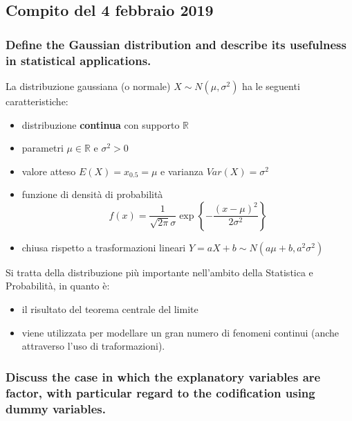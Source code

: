 \documentclass[
]{article}
\begin{document}
\hypertarget{compito-del-4-febbraio-2019}{%
\subsection{Compito del 4 febbraio
2019}\label{compito-del-4-febbraio-2019}}

\hypertarget{define-the-gaussian-distribution-and-describe-its-usefulness-in-statistical-applications.}{%
\subsubsection{Define the Gaussian distribution and describe its
usefulness in statistical
applications.}\label{define-the-gaussian-distribution-and-describe-its-usefulness-in-statistical-applications.}}

La distribuzione gaussiana (o normale) \(X \sim N(\mu, \sigma^2)\) ha le
seguenti caratteristiche:

\begin{itemize}
\item
  distribuzione \textbf{continua} con supporto \(\mathbb{R}\)
\item
  parametri \(\mu \in \mathbb{R}\) e \(\sigma^2 > 0\)
\item
  valore atteso \(E(X) = x_{0.5} = \mu\) e varianza
  \(Var(X) = \sigma^2\)
\item
  funzione di densità di probabilità
  \[f(x) = \frac{1}{\sqrt{2\pi}\sigma}\exp \left\{ - \frac{(x-\mu)^2}{2\sigma^2} \right\}\]
\item
  chiusa rispetto a trasformazioni lineari
  \(Y = aX+b \sim N(a\mu+b, a^2\sigma^2)\)
\end{itemize}

Si tratta della distribuzione più importante nell'ambito della
Statistica e Probabilità, in quanto è:

\begin{itemize}
\item
  il risultato del teorema centrale del limite
\item
  viene utilizzata per modellare un gran numero di fenomeni continui
  (anche attraverso l'uso di traformazioni).
\end{itemize}

\hypertarget{discuss-the-case-in-which-the-explanatory-variables-are-factor-with-particular-regard-to-the-codification-using-dummy-variables.}{%
\subsubsection{Discuss the case in which the explanatory variables are
factor, with particular regard to the codification using dummy
variables.}\label{discuss-the-case-in-which-the-explanatory-variables-are-factor-with-particular-regard-to-the-codification-using-dummy-variables.}}
\end{document}
